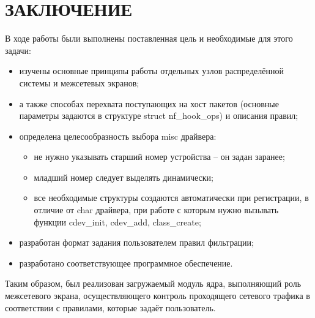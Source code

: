 \section*{ЗАКЛЮЧЕНИЕ}

В ходе работы были выполнены поставленная цель и необходимые для этого задачи:
\begin{itemize}
	\item изучены основные принципы работы отдельных узлов распределённой системы и межсетевых экранов;

	\item а также способах перехвата поступающих на хост пакетов (основные параметры задаются в структуре struct nf\_hook\_ops) и описания правил;
	
	\item определена целесообразность выбора misc драйвера:
	\begin{itemize}
		\item не нужно указывать старший номер устройства -- он задан заранее;
		
		\item младший номер следует выделять динамически;
		
		\item все необходимые структуры создаются автоматически при регистрации, в отличие от char драйвера, при работе с которым нужно вызывать функции cdev\_init, cdev\_add, class\_create;
	\end{itemize}

	\item разработан формат задания пользователем правил фильтрации;
	
	\item разработано соответствующее программное обеспечение.\newline
\end{itemize}

Таким образом, был реализован загружаемый модуль ядра, выполняющий роль межсетевого экрана, осуществляющего контроль проходящего сетевого трафика в соответствии с правилами, которые задаёт пользователь. 

\pagebreak